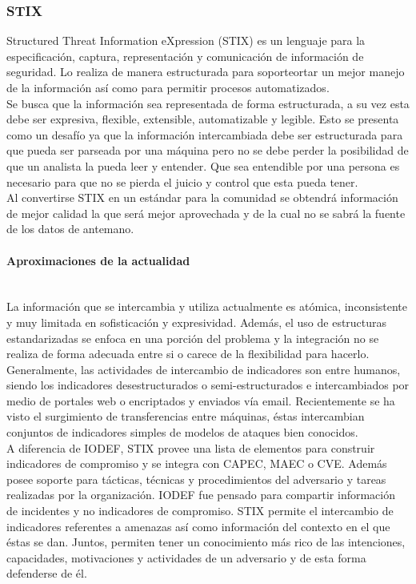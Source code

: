 \subsubsection{STIX}

Structured Threat Information eXpression (STIX) es un lenguaje para la especificación, captura, representación y 
comunicación de información de seguridad. Lo realiza de manera 
estructurada para soporteortar un mejor manejo de la información así como para 
permitir procesos automatizados.\\

Se busca que la información sea representada de forma estructurada, a su vez 
esta debe ser expresiva, flexible, extensible, automatizable y legible. Esto se 
presenta como un desafío ya que la información intercambiada debe ser 
estructurada para que pueda ser parseada por una máquina pero no se debe perder 
la posibilidad de que un analista la pueda leer y entender. Que sea entendible 
por una persona es necesario para que no se pierda el juicio y control que esta 
pueda tener.\\

Al convertirse STIX en un estándar para la comunidad se obtendrá información de 
mejor calidad la que será mejor aprovechada y de la cual no se sabrá la fuente 
de los datos de antemano.

\paragraph{Aproximaciones de la actualidad}\ \\

La información que se intercambia y utiliza actualmente es atómica, inconsistente 
y muy limitada en sofisticación y expresividad. Además, el uso de estructuras 
estandarizadas se enfoca en una porción del problema y la integración no se 
realiza de forma adecuada entre si o carece de la flexibilidad para hacerlo. 
Generalmente, las actividades de intercambio de indicadores son entre humanos, 
siendo los indicadores desestructurados o semi-estructurados e intercambiados 
por medio de portales web o encriptados y enviados vía email. Recientemente se 
ha visto el surgimiento de transferencias entre máquinas, éstas intercambian 
conjuntos de indicadores simples de modelos de ataques bien conocidos.\\

A diferencia de IODEF, STIX provee una lista de elementos para construir 
indicadores de compromiso y se integra con CAPEC, MAEC o CVE. Además posee 
soporte para tácticas, técnicas y procedimientos del adversario y tareas 
realizadas por la organización. IODEF fue pensado para compartir información de 
incidentes y no indicadores de compromiso. STIX permite el intercambio de 
indicadores referentes a amenazas así como información del contexto en el que 
éstas se dan. Juntos, permiten tener un conocimiento más rico de las 
intenciones, capacidades, motivaciones y actividades de un adversario y de esta 
forma defenderse de él.\\

